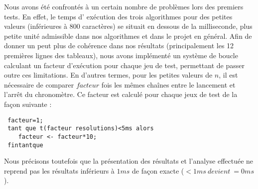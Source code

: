 \label{facteur}
Nous avons été confrontés à un certain nombre de problèmes lors des premiers tests. En effet, le temps d’ exécution des trois algorithmes pour des petites valeurs (inférieures à 800 caractères) se situait en dessous de la milliseconde, plus petite unité admissible dans nos algorithmes et dans le projet en général.
Afin de donner un peut plus de cohérence dans nos résultats (principalement les 12 premières lignes des tableaux), nous avons implémenté un système de boucle calculant un facteur d'exécution pour chaque jeu de test, permettant de passer outre ces limitations.
En d'autres termes, pour les petites valeurs de $n$, il est nécessaire de comparer $facteur$ fois les mêmes chaînes entre le lancement et l'arrêt du chronomètre. Ce facteur est calculé pour chaque jeux de test de la façon suivante :
\begin{lstlisting}
 facteur=1;
 tant que t(facteur resolutions)<5ms alors
    facteur <- facteur*10;
 fintantque
\end{lstlisting}

Nous précisons toutefois que la présentation des résultats et l'analyse effectuée ne reprend pas les résultats inférieurs à $1ms$ de façon exacte ($<1ms\ devient\ =0ms$).